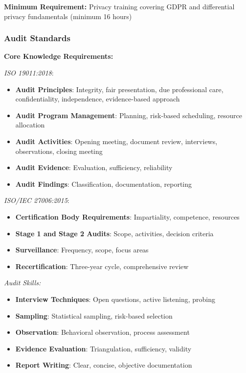 \documentclass[11pt,a4paper]{article}
\begin{document}
\textbf{Minimum Requirement:} Privacy training covering GDPR and differential privacy fundamentals (minimum 16 hours)

\subsubsection{Audit Standards}

\textbf{Core Knowledge Requirements:}

\textit{ISO 19011:2018}:
\begin{itemize}
\item \textbf{Audit Principles}: Integrity, fair presentation, due professional care, confidentiality, independence, evidence-based approach
\item \textbf{Audit Program Management}: Planning, risk-based scheduling, resource allocation
\item \textbf{Audit Activities}: Opening meeting, document review, interviews, observations, closing meeting
\item \textbf{Audit Evidence}: Evaluation, sufficiency, reliability
\item \textbf{Audit Findings}: Classification, documentation, reporting
\end{itemize}

\textit{ISO/IEC 27006:2015}:
\begin{itemize}
\item \textbf{Certification Body Requirements}: Impartiality, competence, resources
\item \textbf{Stage 1 and Stage 2 Audits}: Scope, activities, decision criteria
\item \textbf{Surveillance}: Frequency, scope, focus areas
\item \textbf{Recertification}: Three-year cycle, comprehensive review
\end{itemize}

\textit{Audit Skills:}
\begin{itemize}
\item \textbf{Interview Techniques}: Open questions, active listening, probing
\item \textbf{Sampling}: Statistical sampling, risk-based selection
\item \textbf{Observation}: Behavioral observation, process assessment
\item \textbf{Evidence Evaluation}: Triangulation, sufficiency, validity
\item \textbf{Report Writing}: Clear, concise, objective documentation
\end{itemize}
\end{document}
